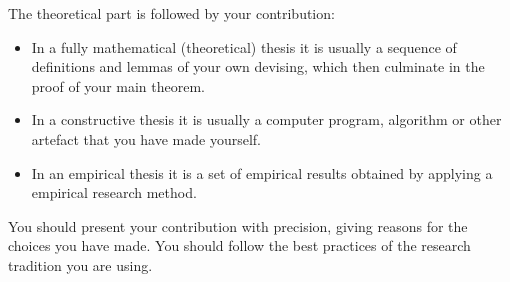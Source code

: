 The theoretical part is followed by your contribution:
\begin{itemize}
\item In a fully mathematical (theoretical) thesis it is usually a sequence of
  definitions and lemmas of your own devising, which then culminate in
  the proof of your main theorem.
\item In a constructive thesis it is usually a computer program, algorithm or
  other artefact that you have made yourself.
\item In an empirical thesis it is a set of empirical results obtained
  by applying a empirical research method.
\end{itemize}

You should present your contribution with precision, giving reasons
for the choices you have made.  You should follow the best practices
of the research tradition you are using.